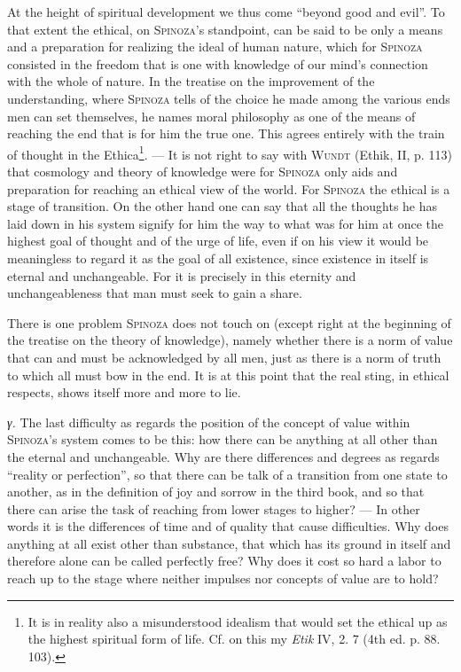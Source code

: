 \documentclass[12pt]{article}
\begin{document}
At the height of spiritual development we thus come ``beyond good and evil''. To that extent the
ethical, on \textsc{Spinoza}'s standpoint, can be said to be only a means and a preparation for
realizing the ideal of human nature, which for \textsc{Spinoza} consisted in the freedom that is one
with knowledge of our mind's connection with the whole of nature. In the treatise on the
improvement of the understanding, where \textsc{Spinoza} tells of the choice he made among the
various ends men can set themselves, he names moral philosophy as one of the means of reaching the
end that is for him the true one. This agrees entirely with the train of thought in the
Ethica\footnote{It is in reality also a misunderstood idealism that would set the ethical up as the
highest spiritual form of life. Cf. on this my \textit{Etik} IV, 2. 7 (4th ed. p. 88. 103).}. ---
It is not right to say with \textsc{Wundt} (Ethik, II, p. 113) that cosmology and theory of
knowledge were for \textsc{Spinoza} only aids and preparation for reaching an ethical view of the
world. For \textsc{Spinoza} the ethical is a stage of transition. On the other hand one can say that
all the thoughts he has laid down in his system signify for him the way to what was for him at once
the highest goal of thought and of the urge of life, even if on his view it would be meaningless to
regard it as the goal of all existence, since existence in itself is eternal and unchangeable. For
it is precisely in this eternity and unchangeableness that man must seek to gain a share.

There is one problem \textsc{Spinoza} does not touch on (except right at the beginning of the
treatise on the theory of knowledge), namely whether there is a norm of value that can and must be
acknowledged by all men, just as there is a norm of truth to which all must bow in the end. It is
at this point that the real sting, in ethical respects, shows itself more and more to lie.

\textit{γ.} The last difficulty as regards the position of the concept of value within
\textsc{Spinoza}'s system comes to be this: how there can be anything at all other than the eternal
and unchangeable. Why are there differences and degrees as regards ``reality or perfection'', so
that there can be talk of a transition from one state to another, as in the definition of joy and
sorrow in the third book, and so that there can arise the task of reaching from lower stages to
higher? --- In other words it is the differences of time and of quality that cause difficulties.
Why does anything at all exist other than substance, that which has its ground in itself and
therefore alone can be called perfectly free? Why does it cost so hard a labor to reach up to the
stage where neither impulses nor concepts of value are to hold?
\end{document}

